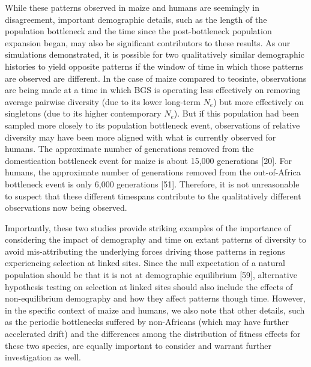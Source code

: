 \documentclass[9pt,twocolumn,twoside]{rilabRxiv}
\begin{document}
While these patterns observed in maize and humans are seemingly in
disagreement, important demographic details, such as the length of the
population bottleneck and the time since the post-bottleneck population
expansion began, may also be significant contributors to these results.
As our simulations demonstrated, it is possible for two qualitatively
similar demographic histories to yield opposite patterns if the window
of time in which those patterns are observed are different. In the case
of maize compared to teosinte, observations are being made at a time in
which BGS is operating less effectively on removing average pairwise
diversity (due to its lower long-term $N_e$) but
more effectively on singletons (due to its higher contemporary
$N_e$). But if this population had been sampled more
closely to its population bottleneck event, observations of relative
diversity may have been more aligned with what is currently observed for
humans. The approximate number of generations removed from the
domestication bottleneck event for maize is about 15,000 generations
[20]. For humans, the approximate number of generations removed from
the out-of-Africa bottleneck event is only 6,000 generations [51].
Therefore, it is not unreasonable to suspect that these different
timespans contribute to the qualitatively different observations now
being observed.

Importantly, these two studies provide striking examples of the
importance of considering the impact of demography and time on extant
patterns of diversity to avoid mis-attributing the underlying forces
driving those patterns in regions experiencing selection at linked
sites. Since the null expectation of a natural population should be that
it is not at demographic equilibrium [59], alternative hypothesis
testing on selection at linked sites should also include the effects of
non-equilibrium demography and how they affect patterns though time.
However, in the specific context of maize and humans, we also note that
other details, such as the periodic bottlenecks suffered by non-Africans
(which may have further accelerated drift) and the differences among the
distribution of fitness effects for these two species, are equally
important to consider and warrant further investigation as well.
\end{document}
